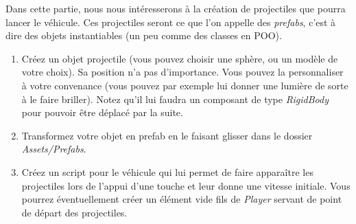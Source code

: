 Dans cette partie, nous nous intéresserons à la création de projectiles que pourra lancer le véhicule. Ces projectiles seront ce que l'on appelle des \textit{prefabs}, c'est à dire des objets instantiables (un peu comme des classes en POO).

\begin{enumerate}
\item Créez un objet projectile (vous pouvez choisir une sphère, ou un modèle de votre choix). Sa position n'a pas d'importance. Vous pouvez la personnaliser à votre convenance (vous pouvez par exemple lui donner une lumière de sorte à le faire briller). Notez qu'il lui faudra un composant de type \textit{RigidBody} pour pouvoir être déplacé par la suite.
\item Transformez votre objet en prefab en le faisant glisser dans le dossier \textit{Assets/Prefabs}.
\item Créez un script pour le véhicule qui lui permet de faire apparaître les projectiles lors de l'appui d'une touche et leur donne une vitesse initiale. Vous pourrez éventuellement créer un élément vide fils de \textit{Player} servant de point de départ des projectiles.
\end{enumerate}